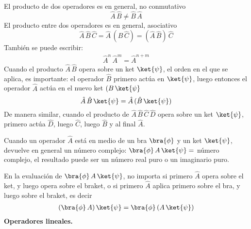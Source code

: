 El producto de dos operadores es en general, no conmutativo
\begin{equation}
\hat{A} \, \hat{B} \neq \hat{B} \, \hat{A}
\label{eq:ecuacion_02_53}
\end{equation}
El producto entre dos operadores es en general, asociativo
\begin{equation}
\hat{A} \, \hat{B} \, \hat{C} =  \hat{A} \, (\hat{B} \, \hat{C}) = (\hat{A} \, \hat{B}) \, \hat{C} 
\label{eq:ecuacion_02_54}
\end{equation}
También se puede escribir:
\begin{align*}
\hat{A}^{n} \, \hat{A}^{m} = \hat{A}^{n + m}
\end{align*}
Cuando el producto $\hat{A} \, \hat{B}$ opera sobre un ket $\ket{\psi}$, el orden en el que se aplica, es importante: el operador $\hat{B}$ primero actúa en $\ket{\psi}$, luego entonces el operador $\hat{A}$ actúa en el nuevo ket $(B \, \ket{\psi}$
\begin{equation}
\hat{A} \, \hat{B} \, \ket{\psi} = \hat{A} \, (\hat{B} \, \ket{\psi})
\label{eq:ecuacion_02_55}
\end{equation}
De manera similar, cuando el producto de $\hat{A} \, \hat{B} \, \hat{C} \, \hat{D}$ opera sobre un ket $\ket{\psi}$, primero actúa $\hat{D}$, luego $\hat{C}$, luego $\hat{B}$ y al final $\hat{A}$.
\par
Cuando un operador $\hat{A}$ está en medio de un bra $\bra{\phi}$ y un ket $\ket{\psi}$, devuelve en general un número complejo: $\bra{\phi} \, A \, \ket{\psi} =$ número complejo, el resultado puede ser un número real puro o un imaginario puro.
\par
En la evaluación de $\bra{\phi} \, A \, \ket{\psi}$, no importa si primero $\hat{A}$ opera sobre el ket, y luego opera sobre el braket, o si primero $\hat{A}$ aplica primero sobre el bra, y luego sobre el braket, es decir
\begin{align*}
(\bra{\phi} \, A) \, \ket{\psi} = \bra{\phi} \, (A \, \ket{\psi})
\end{align*}
\textbf{Operadores lineales.}

